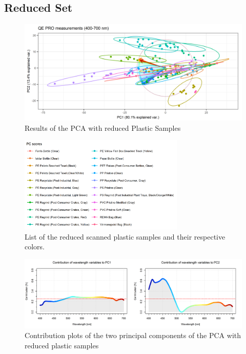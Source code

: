 \begin{appendices}
\section{Reduced Set}
\begin{figure}[H]
    \centering
    \includegraphics[width=1\textwidth]{Images/results/PCA_plastics_reduced_only_scat.png}
    \caption[PCA Reduced Set]{Results of the PCA with reduced Plastic Samples}
\end{figure}

\begin{figure}[H]
    \centering
    \includegraphics[width=0.7\textwidth]{Images/results/PCA_plastics_reduced_list.png}
    \caption[PCA Reduced Set List]{List of the reduced scanned plastic samples and their respective colors.}
\end{figure}

\begin{figure}[H]
    \centering
    \includegraphics[width=1\textwidth]{Images/results/PCA_plastics_reduced_doub_cont.png}
    \caption[Contribution Plot Reduced Set]{Contribution plots of the two principal components of the PCA with reduced plastic samples}
\end{figure}


\end{appendices}
